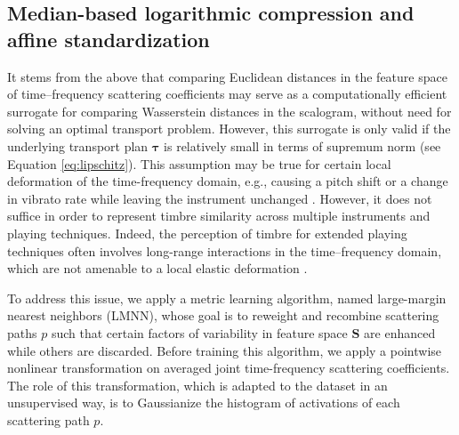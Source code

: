 \documentclass{bmcart}
\makeatletter
\newcommand*{\eg}{e.g.,\@\xspace}
\makeatother
\begin{document}
\subsection*{Median-based logarithmic compression and affine standardization}
\label{sec:gaussianization}

It stems from the above that comparing Euclidean distances in the feature space of time--frequency scattering coefficients may serve as a computationally efficient surrogate for comparing Wasserstein distances in the scalogram, without need for solving an optimal transport problem.
However, this surrogate is only valid if the underlying transport plan $\boldsymbol{\tau}$ is relatively small  in terms of supremum norm (see Equation \ref{eq:lipschitz}).
This assumption may be true for certain local deformation of the time-frequency domain, \eg{} causing a pitch shift or a change in vibrato rate while leaving the instrument unchanged \cite{anden2012scattering}.
However, it does not suffice in order to represent timbre similarity across multiple instruments and playing techniques.
Indeed, the perception of timbre for extended playing techniques often involves long-range interactions in the time--frequency domain, which are not amenable to a local elastic deformation \cite{lostanlen2018extended}.

To address this issue, we apply a metric learning algorithm, named large-margin nearest neighbors (LMNN), whose goal is to reweight and recombine scattering paths $p$ such that certain factors of variability in feature space $\mathbf{S}$ are enhanced while others are discarded.
Before training this algorithm, we apply a pointwise nonlinear transformation on averaged joint time-frequency scattering coefficients. The role of this transformation, which is adapted to the dataset in an unsupervised way, is to Gaussianize the histogram of activations of each scattering path $p$.
\end{document}
